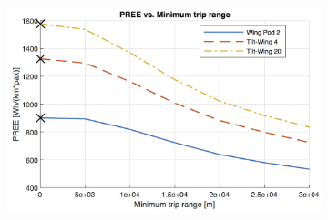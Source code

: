 \begin{figure}[H]
\begin{subfigure}[t]{0.33\textwidth}
    \includegraphics[width=\textwidth]{Figures/report_PREE.png}
    \captionsetup{justification=centering}
    \caption{}
    \label{fig:sens03}
\end{subfigure}
\captionsetup{justification=centering}
\caption{}
\label{fig:sens0123}
\end{figure}


